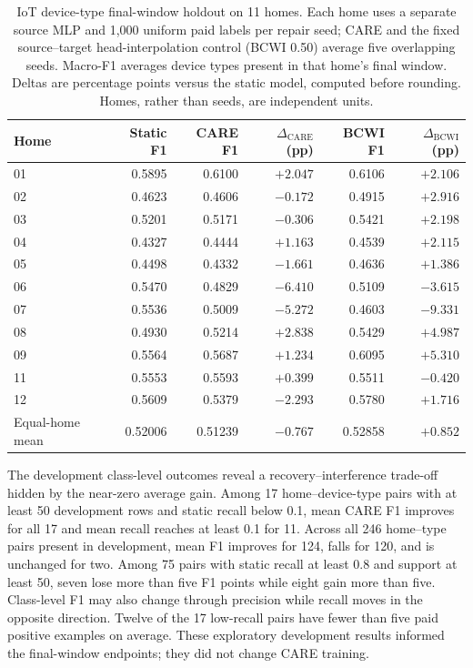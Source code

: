 \documentclass[journal]{IEEEtran}
\newcommand{\ours}{CARE}  %
\begin{document}
\begin{table}[!t]
\centering
\caption{IoT device-type final-window holdout on 11 homes. Each home uses a separate source MLP and 1{,}000 uniform paid labels per repair seed; CARE and the fixed source--target head-interpolation control (BCWI 0.50) average five overlapping seeds. Macro-F1 averages device types present in that home's final window. Deltas are percentage points versus the static model, computed before rounding. Homes, rather than seeds, are independent units.}
\label{tab:iot_homes}
\small
\setlength{\tabcolsep}{7pt}
\begin{tabular}{@{}lrrrrr@{}}
\toprule
Home & Static F1 & \ours{} F1 & $\Delta_{\mathrm{CARE}}$ (pp) & BCWI F1 & $\Delta_{\mathrm{BCWI}}$ (pp) \\
\midrule
01 & 0.5895 & 0.6100 & $+2.047$ & 0.6106 & $+2.106$ \\
02 & 0.4623 & 0.4606 & $-0.172$ & 0.4915 & $+2.916$ \\
03 & 0.5201 & 0.5171 & $-0.306$ & 0.5421 & $+2.198$ \\
04 & 0.4327 & 0.4444 & $+1.163$ & 0.4539 & $+2.115$ \\
05 & 0.4498 & 0.4332 & $-1.661$ & 0.4636 & $+1.386$ \\
06 & 0.5470 & 0.4829 & $-6.410$ & 0.5109 & $-3.615$ \\
07 & 0.5536 & 0.5009 & $-5.272$ & 0.4603 & $-9.331$ \\
08 & 0.4930 & 0.5214 & $+2.838$ & 0.5429 & $+4.987$ \\
09 & 0.5564 & 0.5687 & $+1.234$ & 0.6095 & $+5.310$ \\
11 & 0.5553 & 0.5593 & $+0.399$ & 0.5511 & $-0.420$ \\
12 & 0.5609 & 0.5379 & $-2.293$ & 0.5780 & $+1.716$ \\
\midrule
Equal-home mean & 0.52006 & 0.51239 & $-0.767$ & 0.52858 & $+0.852$ \\
\bottomrule
\end{tabular}
\end{table}

The development class-level outcomes reveal a recovery--interference trade-off hidden by the near-zero average gain. Among 17 home--device-type pairs with at least 50 development rows and static recall below 0.1, mean \ours{} F1 improves for all 17 and mean recall reaches at least 0.1 for 11. Across all 246 home--type pairs present in development, mean F1 improves for 124, falls for 120, and is unchanged for two. Among 75 pairs with static recall at least 0.8 and support at least 50, seven lose more than five F1 points while eight gain more than five. Class-level F1 may also change through precision while recall moves in the opposite direction. Twelve of the 17 low-recall pairs have fewer than five paid positive examples on average. These exploratory development results informed the final-window endpoints; they did not change CARE training.
\end{document}
